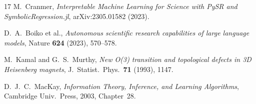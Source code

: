 \documentclass[11pt,a4paper]{article}
\begin{document}
\begin{thebibliography}{17}
M.~Cranmer,
\textit{Interpretable Machine Learning for Science with PySR and SymbolicRegression.jl},
arXiv:2305.01582 (2023).

D.~A.~Boiko et al.,
\textit{Autonomous scientific research capabilities of large language models},
Nature \textbf{624} (2023), 570--578.

M.~Kamal and G.~S.~Murthy,
\textit{New O(3) transition and topological defects in 3D Heisenberg magnets},
J.\ Statist.\ Phys.\ \textbf{71} (1993), 1147.

D.~J.~C.~MacKay,
\emph{Information Theory, Inference, and Learning Algorithms},
Cambridge Univ.\ Press, 2003, Chapter~28.

\end{thebibliography}
\end{document}
